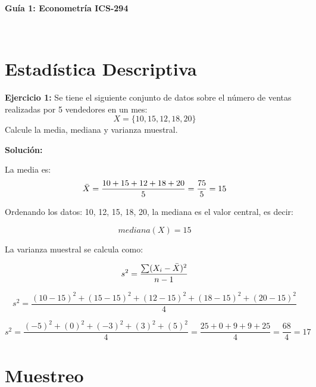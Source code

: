 \documentclass[10pt,a4paper]{article}
\begin{document}
\vspace{5cm}

\begin{center}
\begin{Large}
\textbf{\\Guía 1: Econometría ICS-294}
\end{Large}\\
\end{center}


\section{Estadística Descriptiva}

\textbf{Ejercicio 1:} Se tiene el siguiente conjunto de datos sobre el número de ventas realizadas por 5 vendedores en un mes:
$$X = \{10,15,12,18,20\}$$
Calcule la media, mediana y varianza muestral.

{\color{red} \textbf{Solución:}

La media es:
$$\Bar{X} = \frac{10+15+12+18+20}{5} = \frac{75}{5} = 15$$

Ordenando los datos: {10, 12, 15, 18, 20}, la mediana es el valor central, es decir:

$$mediana(X) = 15$$

La varianza muestral se calcula como:

$$s^2 = \frac{\sum (X_i - \Bar{X})^2}{n-1}$$

$$s^2 = \frac{(10-15)^2 + (15-15)^2 + (12 - 15)^2 + (18-15)^2 + (20-15)^2}{4}$$

$$s^2 = \frac{(-5)^2+(0)^2 + (-3)^2 +(3)^2 + (5)^2}{4} = \frac{25+0+9+9+25}{4} = \frac{68}{4} = 17$$}








\section{Muestreo}

\end{document}
